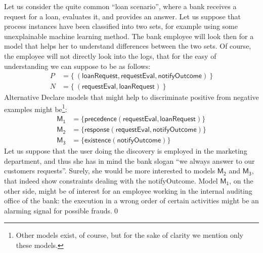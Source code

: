\begin{example}
Let us consider the quite common ``loan scenario'', where a bank receives a request for a loan, evaluates it, and provides an answer. Let us suppose that process instances have been classified into two sets, for example using some unexplainable machine learning method. The bank employee will look then for a model that helps her to understand differences between the two sets. Of course, the employee will not directly look into the logs, that for the easy of understanding we can suppose to be as follows:
%
\begin{align*}
P & = \{\ (\mathsf{loanRequest}, \mathsf{requestEval}, \mathsf{notifyOutcome})\ \} \\
N & = \{\ (\mathsf{requestEval}, \mathsf{loanRequest})\ \}
\end{align*}
%
Alternative Declare models that might help to discriminate positive from negative examples might be\footnote{Other models exist, of course, but for the sake of clarity we mention only these models.}:
%
\begin{align*}
\mathsf{M_1} & = \{ \mathsf{precedence(requestEval,loanRequest)}\} \\
\mathsf{M_2} & = \{ \mathsf{response(requestEval, notifyOutcome)}\} \\
\mathsf{M_3} & = \{ \mathsf{existence(notifyOutcome)}\}
\end{align*}
%
Let us suppose that the user doing the discovery is employed in the marketing department, and thus she has in mind the bank slogan ``we always answer to our customers requests''. Surely, she would be more interested to models $\mathsf{M_2}$ and $\mathsf{M_3}$, that indeed show constraints dealing with the \textsf{notifyOutcome}.
%
Model $\mathsf{M_1}$, on the other side, might be of interest for an employee working in the internal auditing office of the bank: the execution in a wrong order of certain activities might be an alarming signal for possible frauds.\qed
%
\end{example}

